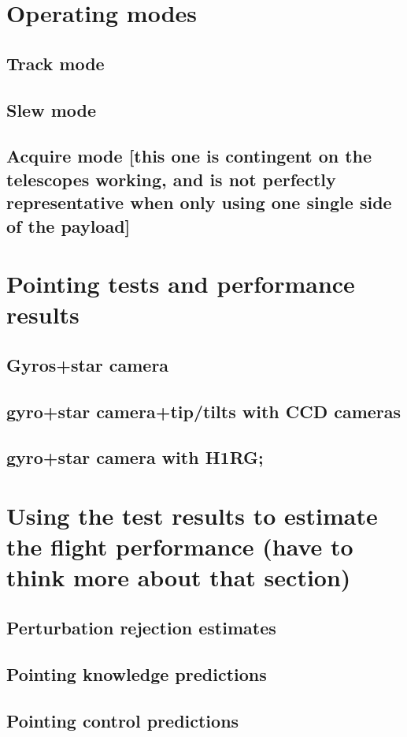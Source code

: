 \section{Operating modes}
\subsection{Track mode}
\subsection{	Slew mode}
\subsection{	Acquire mode [this one is contingent on the telescopes working, and is not perfectly representative when only using one single side of the payload]}

\section{Pointing tests and performance results}
\subsection{	Gyros+star camera}
\subsection{	gyro+star camera+tip/tilts with CCD cameras}
\subsection{	gyro+star camera with H1RG;}

\section{	Using the test results to estimate the flight performance (have to think more about that section)}
\subsection{	Perturbation rejection estimates}
\subsection{	Pointing knowledge predictions}
\subsection{	Pointing control predictions}
